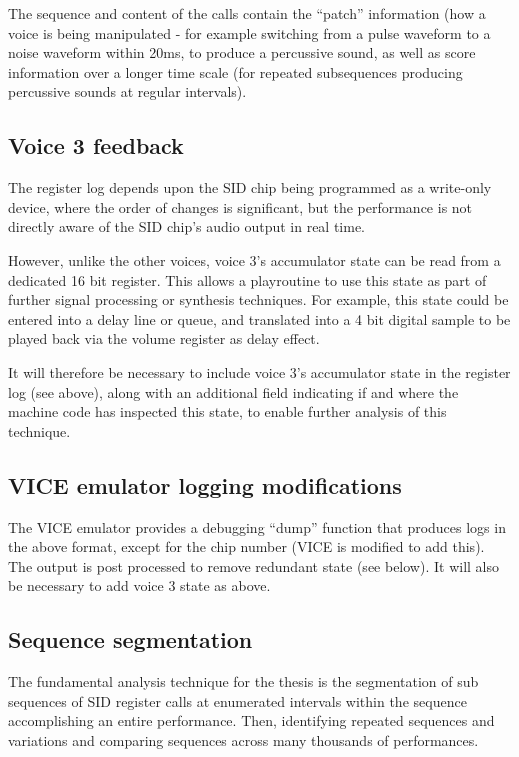 \documentclass[10pt]{article}
\begin{document}
\begin{multicols*}{2}
The sequence and content of the calls contain the “patch” information (how a voice is being manipulated - for example switching from a pulse waveform to a noise waveform within 20ms, to produce a percussive sound, as well as score information over a longer time scale (for repeated subsequences producing percussive sounds at regular intervals).
    
\subsection{Voice 3 feedback}

The register log depends upon the SID chip being programmed as a write-only device, where the order of changes is significant, but the performance is not directly aware of the SID chip’s audio output in real time.

However, unlike the other voices, voice 3’s accumulator state can be read from a dedicated 16 bit register. This allows a playroutine to use this state as part of further signal processing or synthesis techniques. For example, this state could be entered into a delay line or queue, and translated into a 4 bit digital sample to be played back via the volume register as delay effect.

It will therefore be necessary to include voice 3’s accumulator state in the register log (see above), along with an additional field indicating if and where the machine code has inspected this state, to enable further analysis of this technique.

\subsection{VICE emulator logging modifications}

The VICE emulator provides a debugging “dump” function that produces logs in the above format, except for the chip number (VICE is modified to add this). The output is post processed to remove redundant state (see below). It will also be necessary to add voice 3 state as above.

\subsection{Sequence segmentation}

The fundamental analysis technique for the thesis is the segmentation of sub sequences of SID register calls at enumerated intervals within the sequence accomplishing an entire performance. Then, identifying repeated sequences and variations and comparing sequences across many thousands of performances.


\end{multicols*}
\end{document}
